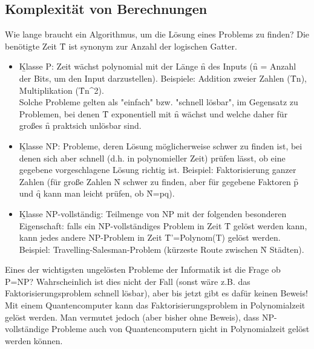 \subsection{Komplexität von Berechnungen}
Wie lange braucht ein Algorithmus, um die Lösung eines Problems zu finden? Die benötigte Zeit \f{T} ist synonym zur Anzahl der logischen Gatter.
\begin{itemize}
    \item \b{Klasse P}: Zeit wächst polynomial mit der Länge \f{n} des Inputs (\f{n} = Anzahl der Bits, um den Input darzustellen). Beispiele: Addition zweier Zahlen (\f{T\propto n}), Multiplikation (\f{T\propto n^2}).\\
    Solche Probleme gelten als "einfach" bzw. "schnell lösbar", im Gegensatz zu Problemen, bei denen \f{T} exponentiell mit \f{n} wächst und welche daher für großes \f{n} praktsich unlösbar sind.
    \item \b{Klasse NP}: Probleme, deren Lösung möglicherweise schwer zu finden ist, bei denen sich aber schnell (d.h. in polynomieller Zeit) prüfen lässt, ob eine gegebene vorgeschlagene Lösung richtig ist. Beispiel: Faktorisierung ganzer Zahlen (für große Zahlen \f{N} schwer zu finden, aber für gegebene Faktoren \f{p} und \f{q} kann man leicht prüfen, ob \f{N=pq}).
    \item \b{Klasse NP-vollständig}: Teilmenge von NP mit der folgenden besonderen Eigenschaft: falls ein NP-vollständiges Problem in Zeit \f{T} gelöst werden kann, kann jedes andere NP-Problem in Zeit \f{T'=\textrm{Polynom}(T)} gelöst werden.\\Beispiel: Travelling-Salesman-Problem (kürzeste Route zwischen \f{N} Städten).
\end{itemize}

Eines der wichtigsten ungelösten Probleme der Informatik ist die Frage ob P=NP? Wahrscheinlich ist dies nicht der Fall (sonst wäre z.B. das Faktorisierungsproblem schnell lösbar), aber bis jetzt gibt es dafür keinen Beweis!\\
Mit einem Quantencomputer kann das Faktorisierungsproblem in Polynomialzeit gelöst werden. Man vermutet jedoch (aber bisher ohne Beweis), dass NP-vollständige Probleme auch von Quantencomputern \b{nicht} in Polynomialzeit gelöst werden können.

